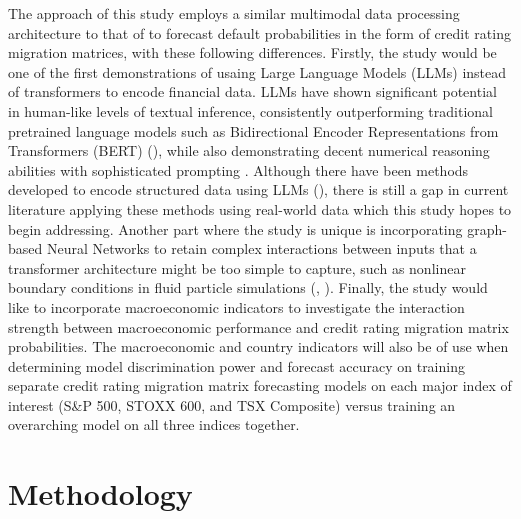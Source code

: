 \documentclass[10pt]{article}
\begin{document}
\begin{multicols*}{2}
The approach of this study employs a similar multimodal data processing architecture to that of \citep{korangi} to forecast default probabilities in the form of credit rating migration matrices, with these following differences. Firstly, the study would be one of the first demonstrations of usaing Large Language Models (LLMs) instead of transformers to encode financial data. LLMs have shown significant potential in human-like levels of textual inference, consistently outperforming traditional pretrained language models such as Bidirectional Encoder Representations from Transformers (BERT) (\citep{tian}),
while also demonstrating decent numerical reasoning abilities with sophisticated prompting \citep{ahn}. Although there have been methods developed to encode structured data using LLMs (\citep{perozzi}), there is still a gap in current literature applying these methods using real-world data which this study hopes to begin addressing. Another part where the study is unique is incorporating graph-based Neural Networks to retain complex interactions between inputs that a transformer architecture might be too simple to capture, such as nonlinear boundary conditions in fluid particle simulations (\citep{horie}, \citep{zhang}). 
Finally, the study would like to incorporate macroeconomic indicators to investigate the interaction strength between macroeconomic performance and credit rating migration matrix probabilities. The macroeconomic and country indicators will also be of use when determining model discrimination power and forecast accuracy on training separate credit rating migration matrix forecasting models on each major index of interest (S\&P 500, STOXX 600, and TSX Composite) versus training an overarching model on all three indices together. 

\section{Methodology}\label{methodology}


\end{multicols*}
\end{document}

